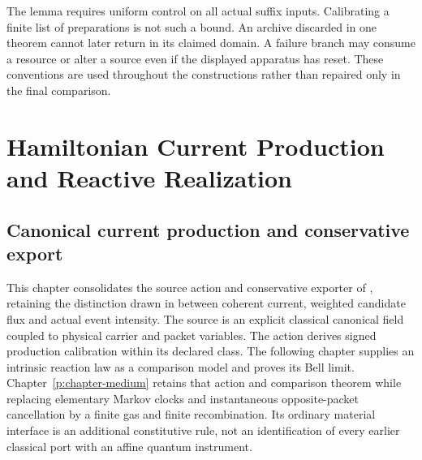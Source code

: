 \documentclass[11pt,oneside,openany]{book}
\theoremstyle{definition}
\theoremstyle{remark}\newtheorem{remark}[theorem]{Remark}
\begin{document}
The lemma requires uniform control on all actual suffix inputs. Calibrating a finite list of preparations is not such a bound. An archive discarded in one theorem cannot later return in its claimed domain. A failure branch may consume a resource or alter a source even if the displayed apparatus has reset. These conventions are used throughout the constructions rather than repaired only in the final comparison.


\part{Hamiltonian Current Production and Reactive Realization}\label{part:kinetic}

\providecommand{\kinTV}{d_{\mathrm{TV}}}
\providecommand{\kinLaw}{\operatorname{Law}}
\providecommand{\kinVar}{\operatorname{Var}}

\chapter{Canonical current production and conservative export}
\label{kin:production}

This chapter consolidates the source action and conservative exporter of
\cite{M01}, retaining the distinction drawn in \cite{M02} between coherent
current, weighted candidate flux and actual event intensity. The source is
an explicit classical canonical field coupled to physical carrier and packet
variables. The action derives signed production calibration within its
declared class. The following chapter supplies an intrinsic reaction law
as a comparison model and proves its Bell limit. Chapter~\ref{p:chapter-medium}
retains that action and comparison theorem while replacing elementary Markov
clocks and instantaneous opposite-packet cancellation by a finite gas and
finite recombination. Its ordinary material interface is an additional
constitutive rule, not an identification of every earlier classical port
with an affine quantum instrument.
\end{document}
